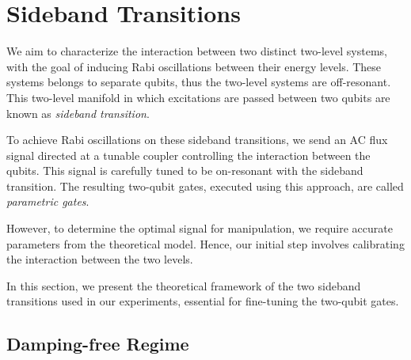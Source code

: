 \section{Sideband Transitions}
\label{sec:sideband_transition}


We aim to characterize the interaction between two distinct two-level systems, with the goal of inducing Rabi oscillations between their energy levels.
These systems belongs to separate qubits, thus the two-level systems are off-resonant.
This two-level manifold in which excitations are passed between two qubits are known as \emph{sideband transition}.

To achieve Rabi oscillations on these sideband transitions, we send an AC flux signal directed at a tunable coupler controlling the interaction between the qubits.
This signal is carefully tuned to be on-resonant with the sideband transition.
The resulting two-qubit gates, executed using this approach, are called \emph{parametric gates}.

However, to determine the optimal signal for manipulation, we require accurate parameters from the theoretical model.
Hence, our initial step involves calibrating the interaction between the two levels.

In this section, we present the theoretical framework of the two sideband transitions used in our experiments, essential for fine-tuning the two-qubit gates.

\subsection{Damping-free Regime}

